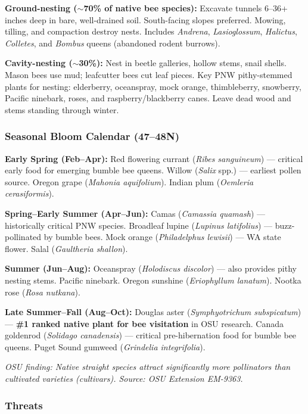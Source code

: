 \documentclass[11pt,letterpaper]{article}
\begin{document}
\textbf{Ground-nesting ($\sim$70\% of native bee species):} Excavate tunnels 6--36+ inches deep in bare, well-drained soil. South-facing slopes preferred. Mowing, tilling, and compaction destroy nests. Includes \textit{Andrena}, \textit{Lasioglossum}, \textit{Halictus}, \textit{Colletes}, and \textit{Bombus} queens (abandoned rodent burrows).

\textbf{Cavity-nesting ($\sim$30\%):} Nest in beetle galleries, hollow stems, snail shells. Mason bees use mud; leafcutter bees cut leaf pieces. Key PNW pithy-stemmed plants for nesting: elderberry, oceanspray, mock orange, thimbleberry, snowberry, Pacific ninebark, roses, and raspberry/blackberry canes. Leave dead wood and stems standing through winter.

\subsubsection{Seasonal Bloom Calendar (47--48\textdegree N)}

\textbf{Early Spring (Feb--Apr):} Red flowering currant (\textit{Ribes sanguineum}) --- critical early food for emerging bumble bee queens. Willow (\textit{Salix} spp.) --- earliest pollen source. Oregon grape (\textit{Mahonia aquifolium}). Indian plum (\textit{Oemleria cerasiformis}).

\textbf{Spring--Early Summer (Apr--Jun):} Camas (\textit{Camassia quamash}) --- historically critical PNW species. Broadleaf lupine (\textit{Lupinus latifolius}) --- buzz-pollinated by bumble bees. Mock orange (\textit{Philadelphus lewisii}) --- WA state flower. Salal (\textit{Gaultheria shallon}).

\textbf{Summer (Jun--Aug):} Oceanspray (\textit{Holodiscus discolor}) --- also provides pithy nesting stems. Pacific ninebark. Oregon sunshine (\textit{Eriophyllum lanatum}). Nootka rose (\textit{Rosa nutkana}).

\textbf{Late Summer--Fall (Aug--Oct):} Douglas aster (\textit{Symphyotrichum subspicatum}) --- \textbf{\#1 ranked native plant for bee visitation} in OSU research. Canada goldenrod (\textit{Solidago canadensis}) --- critical pre-hibernation food for bumble bee queens. Puget Sound gumweed (\textit{Grindelia integrifolia}).

\textit{OSU finding: Native straight species attract significantly more pollinators than cultivated varieties (cultivars). Source: OSU Extension EM-9363.}

\subsubsection{Threats}
\end{document}
